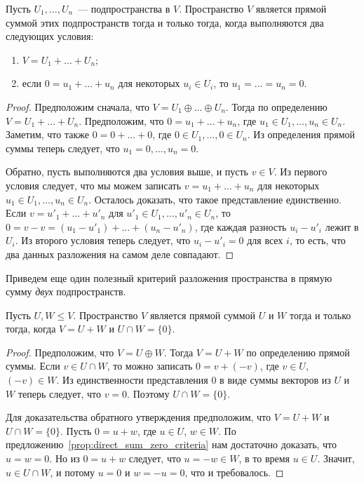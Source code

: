 \begin{proposition}\label{prop:direct_sum_zero_criteria}
Пусть $U_1,\dots,U_n$~--- подпространства в $V$.
Пространство $V$ является прямой суммой этих подпространств тогда
и только тогда, когда выполняются два следующих условия:
\begin{enumerate}
\item $V = U_1 + \dots + U_n$;
\item если $0 = u_1 + \dots + u_n$ для некоторых $u_i\in U_i$, то
$u_1 = \dots = u_n = 0$.
\end{enumerate}
\end{proposition}
\begin{proof}
Предположим сначала, что $V = U_1\oplus\dots\oplus U_n$.
Тогда по определению $V = U_1 + \dots + U_n$.
Предположим, что $0 = u_1 + \dots + u_n$, где $u_1\in U_1,\dots,u_n\in U_n$.
Заметим, что также $0 = 0 + \dots + 0$, где $0\in U_1,\dots,0\in U_n$.
Из определения прямой суммы теперь следует, что 
$u_1 = 0,\dots,u_n=0$.

Обратно, пусть выполняются два условия выше, и пусть $v\in V$.
Из первого условия следует, что мы можем записать
$v = u_1 + \dots + u_n$ для некоторых $u_1\in U_1,\dots,u_n\in U_n$.
Осталось доказать, что такое представление единственно.
Если $v = u'_1 + \dots + u'_n$ для $u'_1\in U_1,\dots,u'_n\in U_n$,
то $0 = v - v = (u_1 - u'_1) + \dots + (u_n - u'_n)$, где каждая
разность $u_i - u'_i$ лежит в $U_i$. Из второго условия теперь
следует, что $u_i - u'_i = 0$ для всех $i$, то есть,
что два данных разложения на самом деле совпадают.
\end{proof}

Приведем еще один полезный критерий разложения пространства
в прямую сумму {\em двух} подпространств.

\begin{proposition}\label{prop:direct-sum-criteria-for-2}
Пусть $U,W\leq V$. Пространство $V$ является прямой суммой $U$ и $W$
тогда и только тогда, когда $V = U+W$ и $U\cap W = \{0\}$.
\end{proposition}
\begin{proof}
Предположим, что $V = U\oplus W$. Тогда $V = U + W$ по определению
прямой суммы. Если $v\in U\cap W$, то можно записать
$0 = v + (-v)$, где $v\in U$, $(-v)\in W$. Из единственности представления
$0$ в виде суммы векторов из $U$ и $W$ теперь следует, что $v=0$.
Поэтому $U\cap W = \{0\}$.

Для доказательства обратного утверждения предположим, что $V = U+W$
и $U\cap W = \{0\}$. Пусть $0 = u+w$, где $u\in U$, $w\in W$.
По предложению~\ref{prop:direct_sum_zero_criteria}
нам достаточно доказать, что $u=w=0$. Но из $0=u+w$ следует,
что $u = -w\in W$, в то время $u\in U$. Значит,
$u\in U\cap W$, и потому $u=0$ и $w = -u = 0$, что и требовалось.
\end{proof}

